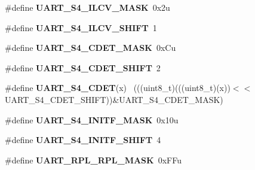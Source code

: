 \begin{DoxyCompactItemize}
\item 
\hypertarget{group___u_a_r_t___register___masks_ga2d321ac0585ef7905e0919ae618adb79}{}\#define {\bfseries U\+A\+R\+T\+\_\+\+S4\+\_\+\+I\+L\+C\+V\+\_\+\+M\+A\+S\+K}~0x2u\label{group___u_a_r_t___register___masks_ga2d321ac0585ef7905e0919ae618adb79}

\item 
\hypertarget{group___u_a_r_t___register___masks_ga35ef480193fd11a985bcb22d8358d1d6}{}\#define {\bfseries U\+A\+R\+T\+\_\+\+S4\+\_\+\+I\+L\+C\+V\+\_\+\+S\+H\+I\+F\+T}~1\label{group___u_a_r_t___register___masks_ga35ef480193fd11a985bcb22d8358d1d6}

\item 
\hypertarget{group___u_a_r_t___register___masks_ga7ed8d5735c9cb49e5b128849e09327f3}{}\#define {\bfseries U\+A\+R\+T\+\_\+\+S4\+\_\+\+C\+D\+E\+T\+\_\+\+M\+A\+S\+K}~0x\+Cu\label{group___u_a_r_t___register___masks_ga7ed8d5735c9cb49e5b128849e09327f3}

\item 
\hypertarget{group___u_a_r_t___register___masks_ga534d1796effd233c19a3888af6e5b5f2}{}\#define {\bfseries U\+A\+R\+T\+\_\+\+S4\+\_\+\+C\+D\+E\+T\+\_\+\+S\+H\+I\+F\+T}~2\label{group___u_a_r_t___register___masks_ga534d1796effd233c19a3888af6e5b5f2}

\item 
\hypertarget{group___u_a_r_t___register___masks_ga91a2728060540e6c614ec575ee91981d}{}\#define {\bfseries U\+A\+R\+T\+\_\+\+S4\+\_\+\+C\+D\+E\+T}(x)                                                ~(((uint8\+\_\+t)(((uint8\+\_\+t)(x))$<$$<$U\+A\+R\+T\+\_\+\+S4\+\_\+\+C\+D\+E\+T\+\_\+\+S\+H\+I\+F\+T))\&U\+A\+R\+T\+\_\+\+S4\+\_\+\+C\+D\+E\+T\+\_\+\+M\+A\+S\+K)\label{group___u_a_r_t___register___masks_ga91a2728060540e6c614ec575ee91981d}

\item 
\hypertarget{group___u_a_r_t___register___masks_gafe4814352b63add10452a9a3afb6f648}{}\#define {\bfseries U\+A\+R\+T\+\_\+\+S4\+\_\+\+I\+N\+I\+T\+F\+\_\+\+M\+A\+S\+K}~0x10u\label{group___u_a_r_t___register___masks_gafe4814352b63add10452a9a3afb6f648}

\item 
\hypertarget{group___u_a_r_t___register___masks_ga8cac54b72ce759559a21c4a65a72404f}{}\#define {\bfseries U\+A\+R\+T\+\_\+\+S4\+\_\+\+I\+N\+I\+T\+F\+\_\+\+S\+H\+I\+F\+T}~4\label{group___u_a_r_t___register___masks_ga8cac54b72ce759559a21c4a65a72404f}

\item 
\hypertarget{group___u_a_r_t___register___masks_ga887fd3a283526907eb1aa53e38788541}{}\#define {\bfseries U\+A\+R\+T\+\_\+\+R\+P\+L\+\_\+\+R\+P\+L\+\_\+\+M\+A\+S\+K}~0x\+F\+Fu\label{group___u_a_r_t___register___masks_ga887fd3a283526907eb1aa53e38788541}


\end{DoxyCompactItemize}
